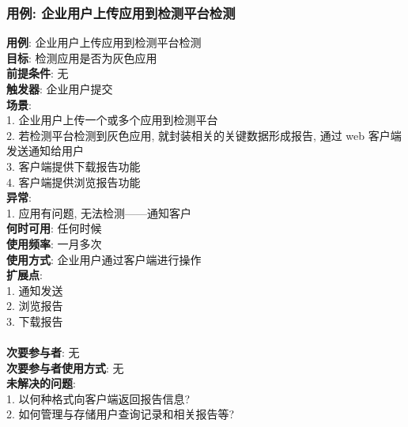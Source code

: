 \documentclass[UTF8]{article}
\begin{document}
\subsubsection{用例: 企业用户上传应用到检测平台检测}
\noindent
\textbf{用例}: 企业用户上传应用到检测平台检测
\\
\textbf{目标}: 检测应用是否为灰色应用
\\
\textbf{前提条件}: 无
\\
\textbf{触发器}: 企业用户提交
\\
\textbf{场景}: \\
	\hspace*{2em} 1. 企业用户上传一个或多个应用到检测平台 \\
	\hspace*{2em} 2. 若检测平台检测到灰色应用, 就封装相关的关键数据形成报告, 通过 web 客户端发送通知给用户 \\
	\hspace*{2em} 3. 客户端提供下载报告功能 \\
	\hspace*{2em} 4. 客户端提供浏览报告功能 \\
\textbf{异常}: \\
	\hspace*{2em} 1. 应用有问题, 无法检测——通知客户 \\
\textbf{何时可用}: 任何时候
\\
\textbf{使用频率}: 一月多次
\\
\textbf{使用方式}: 企业用户通过客户端进行操作 \\
\textbf{扩展点}: \\
	\hspace*{2em} 1. 通知发送 \\
	\hspace*{2em} 2. 浏览报告 \\
	\hspace*{2em} 3. 下载报告 \\
\\
\textbf{次要参与者}: 无
\\
\textbf{次要参与者使用方式}: 无
\\
\textbf{未解决的问题}: \\
	\hspace*{2em} 1. 以何种格式向客户端返回报告信息? \\
	\hspace*{2em} 2. 如何管理与存储用户查询记录和相关报告等? \\
	
\end{document}

